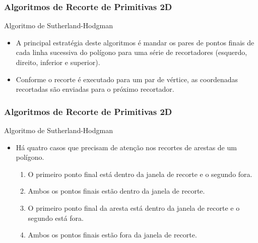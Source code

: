 \documentclass{beamer}
\begin{document}
\begin{frame}
\frametitle{Algoritmos de Recorte de Primitivas 2D}

	\begin{block}{Algoritmo de Sutherland-Hodgman}
		\begin{itemize}
			\item A principal estratégia deste algoritmos é mandar os pares de pontos finais de cada linha sucessiva do polígono para uma série de recortadores (esquerdo, direito, inferior e superior).
			\item Conforme o recorte é executado para um par de vértice, as coordenadas recortadas são enviadas para o próximo recortador. 
		\end{itemize}
	\end{block}
\end{frame}

\begin{frame}
\frametitle{Algoritmos de Recorte de Primitivas 2D}

	\begin{block}{Algoritmo de Sutherland-Hodgman}
		\begin{itemize}
			\item Há quatro casos que precisam de atenção nos recortes de arestas de um polígono.
			\begin{enumerate}
				\item	O primeiro ponto final está dentro da janela de recorte e o segundo fora.
				\item	Ambos os pontos finais estão dentro da janela de recorte.
				\item	O primeiro ponto final da aresta está dentro da janela de recorte e o segundo está fora.
				\item Ambos os pontos finais estão fora da janela de recorte.
			\end{enumerate}			 
		\end{itemize}
	\end{block}
\end{frame}
\end{document}
